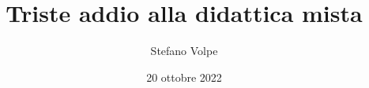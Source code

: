 \documentclass{beamer}
\title{Triste addio alla didattica mista}
\author{Stefano Volpe}
\institute{FUCI Bologna}
\date{20 ottobre 2022}
\begin{document}
\frame{\titlepage}
\end{document}
